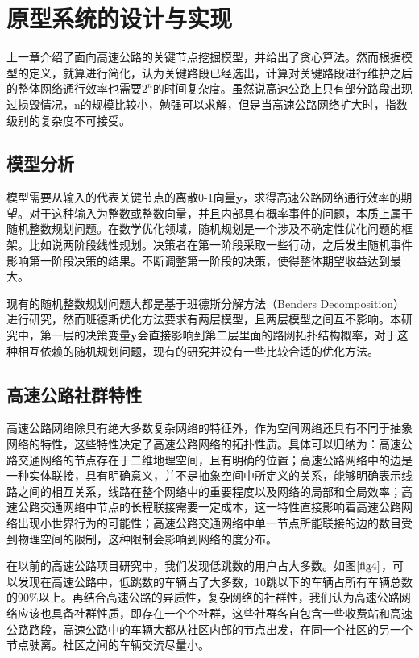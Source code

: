 
\chapter{原型系统的设计与实现}

	上一章介绍了面向高速公路的关键节点挖掘模型，并给出了贪心算法。然而根据模型的定义，就算进行简化，认为关键路段已经选出，计算对关键路段进行维护之后的整体网络通行效率也需要$2^n$的时间复杂度。虽然说高速公路上只有部分路段出现过损毁情况，n的规模比较小，勉强可以求解，但是当高速公路网络扩大时，指数级别的复杂度不可接受。

	\section{模型分析}
		模型需要从输入的代表关键节点的离散0-1向量$\bm{y}$，求得高速公路网络通行效率的期望。对于这种输入为整数或整数向量，并且内部具有概率事件的问题，本质上属于随机整数规划问题。在数学优化领域，随机规划是一个涉及不确定性优化问题的框架。比如说两阶段线性规划。决策者在第一阶段采取一些行动，之后发生随机事件影响第一阶段决策的结果。不断调整第一阶段的决策，使得整体期望收益达到最大。

		现有的随机整数规划问题大都是基于班德斯分解方法（Benders Decomposition）进行研究，然而班德斯优化方法要求有两层模型，且两层模型之间互不影响。本研究中，第一层的决策变量$\bm{y}$会直接影响到第二层里面的路网拓扑结构概率，对于这种相互依赖的随机规划问题，现有的研究并没有一些比较合适的优化方法。

	\section{高速公路社群特性}

		高速公路网络除具有绝大多数复杂网络的特征外，作为空间网络还具有不同于抽象网络的特性，这些特性决定了高速公路网络的拓扑性质。具体可以归纳为：高速公路交通网络的节点存在于二维地理空间，且有明确的位置；高速公路网络中的边是一种实体联接，具有明确意义，并不是抽象空间中所定义的关系，能够明确表示线路之间的相互关系，线路在整个网络中的重要程度以及网络的局部和全局效率；高速公路交通网络中节点的长程联接需要一定成本，这一特性直接影响着高速公路网络出现小世界行为的可能性；高速公路交通网络中单一节点所能联接的边的数目受到物理空间的限制，这种限制会影响到网络的度分布。

		在以前的高速公路项目研究中，我们发现低跳数的用户占大多数。如图$\ref{fig4}$，可以发现在高速公路中，低跳数的车辆占了大多数，10跳以下的车辆占所有车辆总数的90\%以上。再结合高速公路的异质性，复杂网络的社群性，我们认为高速公路网络应该也具备社群性质，即存在一个个社群，这些社群各自包含一些收费站和高速公路路段，高速公路中的车辆大都从社区内部的节点出发，在同一个社区的另一个节点驶离。社区之间的车辆交流尽量小。

